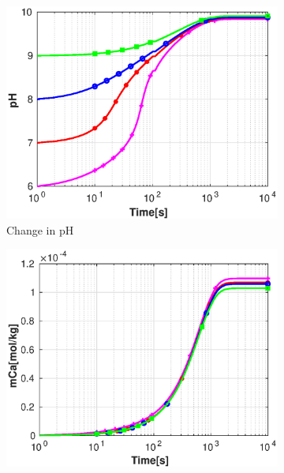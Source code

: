 \begin{figure}[!h]
        \centering
    \begin{subfigure}{.5\linewidth}
        \centering
        \includegraphics[width=\textwidth]{PICTURES/without_vel_pH.eps}
        \caption{\small Change in pH}
        \label{fig:withoutvelpH}       %
    \end{subfigure}%
        \hfill
    \begin{subfigure}{.5\linewidth}
        \centering
        \includegraphics[width=\textwidth]{PICTURES/without_vel_mCa.eps}

\end{subfigure}
\end{figure}
